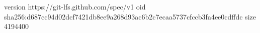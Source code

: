 version https://git-lfs.github.com/spec/v1
oid sha256:d687cc94d02dcf7421db8ee9a268d93ac6b2c7ecaa5737cfccb3fa4ee0cdffdc
size 4194400
